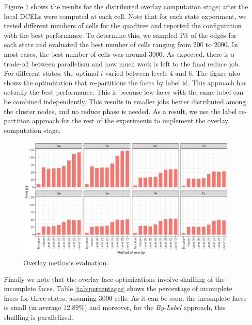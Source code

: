 Figure \ref{fig:overlay_tester} shows the results for the distributed overlay computation stage; after the local DCELs were computed at each cell. 
Note that for each state experiment, we tested different numbers of cells for the quadtree and reported the configuration with the best performance. To determine this, we sampled 1\% of the edges for each state and evaluated the best number of cells ranging from 200 to 2000. In most cases, the best number of cells was around 3000.
As expected, there is a trade-off between parallelism and how much work is left to the final reduce job. For different states, the optimal $i$ varied between levels 4 and 6. The figure also shows the optimization that re-partitions the faces by label id. This approach has actually the best performance. This is because few faces with the same label can be combined independently. This results in smaller jobs better distributed among the cluster nodes, and no reduce phase is needed. As a result, we use the label re-partition approach for the rest of the experiments to implement the overlay computation stage.

\begin{figure}
    \centering
    \includegraphics[width=\linewidth]{chapterSDCEL/OverlayTester/Overlay_Tester}
    \caption{Overlay methods evaluation.}\label{fig:overlay_tester}
\end{figure}

Finally we note that the overlay face optimizations involve shuffling of the incomplete faces. Table \ref{tab:percentages} shows the percentage of incomplete faces for three states, assuming 3000 cells. As it can be seen, the incomplete faces is small (in average 12.89\%) and moreover, for the \textit{By-Label} approach, this shuffling is parallelized.

